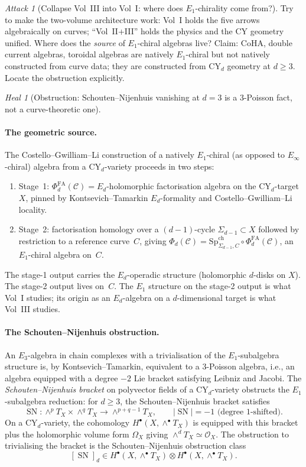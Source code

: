 \documentclass[11pt]{article}
\theoremstyle{definition}
\theoremstyle{remark}
\newtheorem{attack}[thm]{Attack}
\newtheorem{heal}[thm]{Heal}
\newcommand{\cC}{\mathcal{C}}
\newcommand{\cO}{\mathcal{O}}
\newcommand{\Eone}{E_1}
\newcommand{\Ethree}{E_3}
\newcommand{\Einf}{E_\infty}
\newcommand{\FA}{\mathrm{FA}}
\newcommand{\ch}{\mathrm{ch}}
\DeclareMathOperator{\SNij}{SN}
\begin{document}
\begin{attack}[Collapse Vol~III into Vol~I: where does
$\Eone$-chirality come from?]
\label{att:two-volume}
Try to make the two-volume architecture work: Vol~I holds the five
arrows algebraically on curves; ``Vol~II+III'' holds the physics and
the CY geometry unified. Where does the \emph{source} of
$\Eone$-chiral algebras live? Claim: CoHA, double current algebras,
toroidal algebras are natively $\Eone$-chiral but not natively
constructed from curve data; they are constructed from CY$_d$
geometry at $d \geq 3$. Locate the obstruction explicitly.
\end{attack}

\begin{heal}[Obstruction: Schouten--Nijenhuis vanishing at $d = 3$
is a $3$-Poisson fact, not a curve-theoretic one]
\label{heal:two-volume}
\paragraph{The geometric source.}
The Costello--Gwilliam--Li construction of a natively
$\Eone$-chiral (as opposed to $\Einf$-chiral) algebra from a
CY$_d$-variety proceeds in two steps:
\begin{enumerate}[leftmargin=*,itemsep=0pt]
\item Stage~1: $\Phi^{\FA}_d(\cC) = E_d$-holomorphic factorisation
algebra on the CY$_d$-target $X$, pinned by
Kontsevich--Tamarkin $E_d$-formality and Costello--Gwilliam--Li
locality.
\item Stage~2: factorisation homology over a $(d{-}1)$-cycle
$\Sigma_{d-1} \subset X$ followed by restriction to a reference
curve~$C$, giving
$\Phi_d(\cC) = \mathrm{Sp}^{\ch}_{\Sigma_{d-1}, C} \circ
\Phi^{\FA}_d(\cC)$, an $\Eone$-chiral algebra on~$C$.
\end{enumerate}
The stage-1 output carries the $E_d$-operadic structure
(holomorphic $d$-disks on $X$). The stage-2 output lives on~$C$.
The $\Eone$ structure on the stage-2 output is what Vol~I studies;
its origin as an $E_d$-algebra on a $d$-dimensional target is what
Vol~III studies.

\paragraph{The Schouten--Nijenhuis obstruction.}
An $\Ethree$-algebra in chain complexes with a trivialisation of
the $\Eone$-subalgebra structure is, by Kontsevich--Tamarkin,
equivalent to a $3$-Poisson algebra, i.e., an algebra equipped
with a degree $-2$ Lie bracket satisfying Leibniz and Jacobi.
The \emph{Schouten--Nijenhuis bracket} on polyvector fields of a
CY$_d$-variety obstructs the $\Eone$-subalgebra reduction: for
$d \geq 3$, the Schouten--Nijenhuis bracket satisfies
\[
\SNij\colon \wedge^p T_X \times \wedge^q T_X \to \wedge^{p+q-1} T_X,
\qquad
|\SNij| = -1 \text{ (degree } 1\text{-shifted)}.
\]
On a CY$_d$-variety, the cohomology $H^\bullet(X, \wedge^\bullet T_X)$
is equipped with this bracket plus the holomorphic volume form
$\Omega_X$ giving $\wedge^d T_X \simeq \cO_X$. The obstruction to
trivialising the bracket is the Schouten--Nijenhuis obstruction
class
\[
[\SNij]_d \in H^\bullet(X, \wedge^\bullet T_X) \otimes
H^\bullet(X, \wedge^\bullet T_X).
\]


\end{heal}
\end{document}
